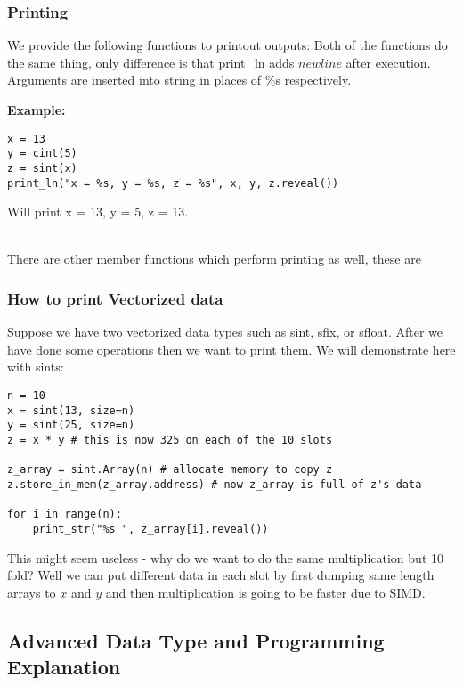 \subsubsection{Printing}
We provide the following functions to printout outputs:
Both of the functions do the same thing, only difference is that print_ln adds $newline$ after execution. Arguments are inserted into string in places of $\%$s respectively. 

\noindent
\textbf{Example:}
\begin{lstlisting}
x = 13
y = cint(5)
z = sint(x)
print_ln("x = %s, y = %s, z = %s", x, y, z.reveal())
\end{lstlisting}
Will print x = 13, y = 5, z = 13.

~\\

\noindent
There are other member functions which perform printing as well, these are


\subsubsection{How to print Vectorized data}
Suppose we have two vectorized data types such as sint, sfix, or sfloat. After we have done some operations then we want to print them. We will demonstrate here with sints:

\begin{lstlisting}
n = 10
x = sint(13, size=n)
y = sint(25, size=n)
z = x * y # this is now 325 on each of the 10 slots

z_array = sint.Array(n) # allocate memory to copy z
z.store_in_mem(z_array.address) # now z_array is full of z's data

for i in range(n):
	print_str("%s ", z_array[i].reveal())
\end{lstlisting}
This might seem useless - why do we want to do the same multiplication but 10 fold? Well we can put different data in each slot by first dumping same length arrays to $x$ and $y$ and then multiplication is going to be faster due to SIMD.

\subsection{Advanced Data Type and Programming Explanation}
		
